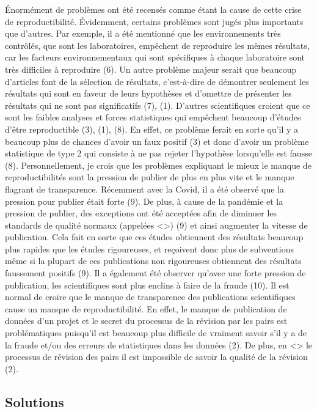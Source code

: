 \documentclass[9pt,twocolumn,twoside,]{pnas-new}
\begin{document}
Énormément de problèmes ont été recensés comme étant la cause de cette
crise de reproductibilité. Évidemment, certains problèmes sont jugés
plus importants que d'autres. Par exemple, il a été mentionné que les
environnements très contrôlés, que sont les laboratoires, empêchent de
reproduire les mêmes résultats, car les facteurs environnementaux qui
sont spécifiques à chaque laboratoire sont très difficiles à reproduire
(6). Un autre problème majeur serait que beaucoup d'articles font de la
sélection de résultats, c'est-à-dire de démontrer seulement les
résultats qui sont en faveur de leurs hypothèses et d'omettre de
présenter les résultats qui ne sont pas significatifs (7), (1). D'autres
scientifiques croient que ce sont les faibles analyses et forces
statistiques qui empêchent beaucoup d'études d'être reproductible (3),
(1), (8). En effet, ce problème ferait en sorte qu'il y a beaucoup plus
de chances d'avoir un faux positif (3) et donc d'avoir un problème
statistique de type 2 qui consiste à ne pas rejeter l'hypothèse
lorsqu'elle est fausse (8). Personnellement, je crois que les problèmes
expliquant le mieux le manque de reproductibilités sont la pression de
publier de plus en plus vite et le manque flagrant de transparence.
Récemment avec la Covid, il a été observé que la pression pour publier
était forte (9). De plus, à cause de la pandémie et la pression de
publier, des exceptions ont été acceptées afin de diminuer les standards
de qualité normaux (appelées \textless{}\textgreater) (9) et ainsi
augmenter la vitesse de publication. Cela fait en sorte que ces études
obtiennent des résultats beaucoup plus rapides que les études
rigoureuses, et reçoivent donc plus de subventions même si la plupart de
ces publications non rigoureuses obtiennent des résultats faussement
positifs (9). Il a également été observer qu'avec une forte pression de
publication, les scientifiques sont plus enclins à faire de la fraude
(10). Il est normal de croire que le manque de transparence des
publications scientifiques cause un manque de reproductibilité. En
effet, le manque de publication de données d'un projet et le secret du
processus de la révision par les pairs est problématiques puisqu'il est
beaucoup plus difficile de vraiment savoir s'il y a de la fraude et/ou
des erreurs de statistiques dans les données (2). De plus, en
\textless{}\textgreater{} le processus de révision des pairs il est
impossible de savoir la qualité de la révision (2).

\hypertarget{solutions}{%
\subsection*{Solutions}\label{solutions}}
\end{document}
